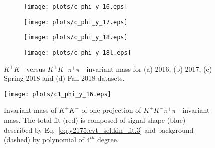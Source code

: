 \begin{figure}[H]
    \centering
    \begin{subfigure}[b]{0.49\textwidth}
        \texttt{[image: plots/c\_phi\_y\_16.eps]}
        \caption{}
        \label{fig.y2175.xsec_ul.yphi2pi.1.a}
    \end{subfigure}
    \begin{subfigure}[b]{0.49\textwidth}
        \texttt{[image: plots/c\_phi\_y\_17.eps]}
        \caption{}
        \label{fig.y2175.xsec_ul.yphi2pi.1.b}
    \end{subfigure}
    \begin{subfigure}[b]{0.49\textwidth}
        \texttt{[image: plots/c\_phi\_y\_18.eps]}
        \caption{}
        \label{fig.y2175.xsec_ul.yphi2pi.1.c}
    \end{subfigure}
    \begin{subfigure}[b]{0.49\textwidth}
        \texttt{[image: plots/c\_phi\_y\_18l.eps]}
        \caption{}
        \label{fig.y2175.xsec_ul.yphi2pi.1.d}
    \end{subfigure}
    \caption{$K^{+}K^{-}$ versus $K^{+}K^{-} \pi^+ \pi^-$ invariant mass for (a) 2016, (b) 2017, (c) Spring 2018 and (d) Fall 2018 datasets.}
    \label{fig.y2175.xsec_ul.yphi2pi.1}
\end{figure}

\begin{figure}[H]
    \centering
    \texttt{[image: plots/c1\_phi\_y\_16.eps]}
    \caption{\label{fig.y2175.xsec_ul.yphi2pi.2}Invariant mass of $K^{+}K^{-}$ of one projection of $K^{+}K^{-} \pi^+ \pi^-$ invariant mass. The total fit (red) is composed of signal shape (blue) described by Eq.~\ref{eq.y2175.evt_sel.kin_fit.3} and background (dashed) by polynomial of $4^{th}$ degree.}
\end{figure}

